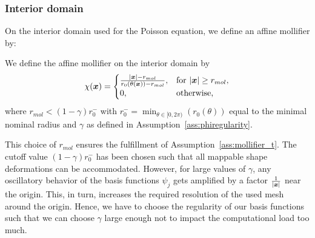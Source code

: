 \subsubsection{Interior domain}\label{subsubsec:interior-domain}
On the interior domain used for the Poisson equation, we define an affine mollifier by:
\begin{definition}\label{def:interior_mollifier}
We define the affine mollifier on the interior domain by
\begin{equation}
    \chi({{\bm{x}}}) = \begin{cases}\frac{|{{\bm{x}}}| - r_{mol}}{r_0(\theta({{\bm{x}}}))- r_{mol}},&\text{for }|{{\bm{x}}}|\geq r_{mol},\\
    0, & \text{otherwise},
    \end{cases}
    \label{eq:interior_mollifier}
\end{equation}
where $r_{mol} < (1-\gamma )r_0^-$ with $r_0^-= \min_{\theta\in [0, 2\pi)} \left(r_0(\theta) \right)$ equal to the minimal nominal radius and $\gamma$ as defined in Assumption~\ref{ass:phiregularity}.
\end{definition}
This choice of $r_{mol}$ ensures the fulfillment of Assumption~\ref{ass:mollifier_t}.
The cutoff value $(1-\gamma )r_0^-$ has been chosen such that all mappable shape deformations can be accommodated.
However, for large values of $\gamma$, any oscillatory behavior of the basis functions $\psi_j$ gets amplified by a factor $\frac{1}{|{{\bm{x}}}|}$ near the origin.
This, in turn, increases the required resolution of the used mesh around the origin.
Hence, we have to choose the regularity of our basis functions such that we can choose $\gamma$ large enough not to impact the computational load too much.

